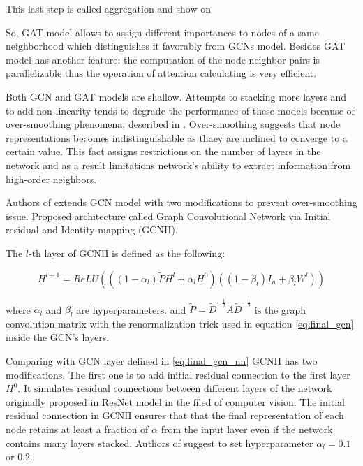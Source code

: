 This last step is called aggregation and show on %

So, GAT model allows to assign different importances to nodes of a same neighborhood which distinguishes it favorably from GCNs
model. Besides GAT model has another feature: the computation of the node-neighbor pairs is parallelizable thus the operation
of attention calculating is very efficient.


Both GCN\cite{GCN} and GAT\cite{GAT} models are shallow. Attempts to stacking more layers and to add non-linearity
tends to degrade the performance of these models \cite{GCNII} because of over-smoothing phenomena, described in \cite{OverSmoothing}.
Over-smoothing suggests that node representations becomes indistinguishable as thaey are inclined to converge 
to a certain value. This fact assigns restrictions on the number of layers in the network and as a result
limitations network's ability to extract information from high-order neighbors.



Authors of \cite{GCNII} extends GCN model with two modifications to prevent over-smoothing issue. Proposed architecture 
called Graph Convolutional Network via Initial residual and Identity mapping (GCNII).

The $l$-th layer of GCNII is defined as the following:

\begin{equation}
    H^{l+1} = ReLU\left( ((1-\alpha_{l})\tilde{P}H^{l} + \alpha_{l}H^{0}) ((1-\beta_{l})I_n + \beta_{l} W^{l})  \right)
    \label{eq:gcnii_layer}
\end{equation}

where $\alpha_l$ and $\beta_l$ are hyperparameters.
and $\tilde{P} = \tilde{D}^{-\frac{1}{2}}A\tilde{D}^{-\frac{1}{2}}$ is the graph 
convolution matrix with the renormalization trick used in equation \ref{eq:final_gcn} inside the GCN's layers.

Comparing with GCN layer defined in \ref{eq:final_gcn_nn} GCNII has two modifications.
The first one is to add initial residual connection to the first layer $H^0$. It simulates 
residual connections between different layers of the network originally proposed in 
ResNet model \cite{ResNet} in the filed of computer vision. 
The initial residual connection in GCNII ensures that that the final representation
of each node retains at least a fraction of $\alpha$ from the input layer even if the network contains
many layers stacked. Authors of \cite{GCNII} suggest to set hyperparameter $\alpha_l = 0.1$ or $0.2$.


